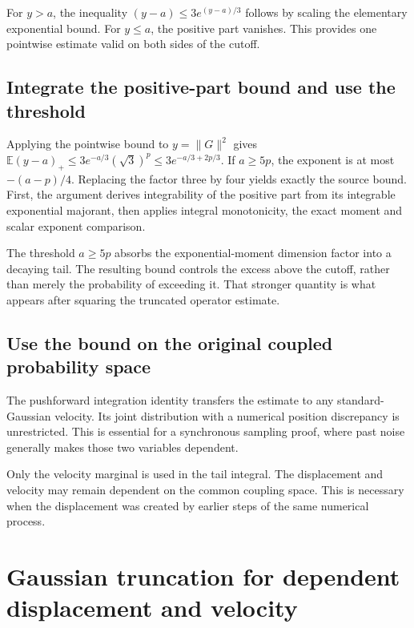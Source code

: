 \documentclass[11pt,a4paper]{report}
\begin{document}
For \(y>a\), the inequality \((y-a)\le3e^{(y-a)/3}\) follows by scaling the elementary exponential bound. For \(y\le a\), the positive part vanishes. This provides one pointwise estimate valid on both sides of the cutoff.

\subsection{\texorpdfstring{Integrate the positive-part bound and use the threshold}{Integrate the positive-part bound and use the threshold}}
\label{report-step-KineticLangevin-GaussianTail-lean-4}


Applying the pointwise bound to \(y=\lVert G\rVert^2\) gives \(\mathbb E(y-a)_+\le3e^{-a/3}(\sqrt3)^p\le3e^{-a/3+2p/3}\). If \(a\ge5p\), the exponent is at most \(-(a-p)/4\). Replacing the factor three by four yields exactly the source bound. First, the argument derives integrability of the positive part from its integrable exponential majorant, then applies integral monotonicity, the exact moment and scalar exponent comparison.



The threshold \(a\ge5p\) absorbs the exponential-moment dimension factor into a decaying tail. The resulting bound controls the excess above the cutoff, rather than merely the probability of exceeding it. That stronger quantity is what appears after squaring the truncated operator estimate.

\subsection{\texorpdfstring{Use the bound on the original coupled probability space}{Use the bound on the original coupled probability space}}
\label{report-step-KineticLangevin-GaussianTail-lean-5}


The pushforward integration identity transfers the estimate to any standard-Gaussian velocity. Its joint distribution with a numerical position discrepancy is unrestricted. This is essential for a synchronous sampling proof, where past noise generally makes those two variables dependent.



Only the velocity marginal is used in the tail integral. The displacement and velocity may remain dependent on the common coupling space. This is necessary when the displacement was created by earlier steps of the same numerical process.

\section{\texorpdfstring{Gaussian truncation for dependent displacement and velocity}{Gaussian truncation for dependent displacement and velocity}}
\label{proof-module-KineticLangevin-GaussianTruncation-lean}
\end{document}
